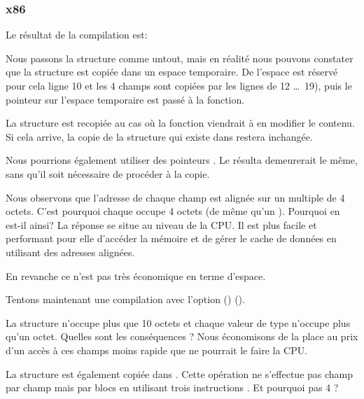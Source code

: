 ﻿\subsubsection{x86}

Le résultat de la compilation est:



Nous passons la structure comme untout, mais en réalité nous pouvons constater que la structure est copiée 
dans un espace temporaire. De l'espace est réservé pour cela ligne 10 et les 4 champs sont copiées par les 
lignes de 12 \ldots\ 19), puis le pointeur sur l'espace temporaire est passé à la fonction.

La structure est recopiée au cas où la fonction \ttf{} viendrait à en modifier le contenu. Si cela arrive, 
la copie de la structure qui existe dans \main restera inchangée.

Nous pourrions également utiliser des pointeurs \CCpp. Le résulta demeurerait le même, sans qu'il soit 
nécessaire de procéder à la copie.

Nous observons que l'adresse de chaque champ est alignée sur un multiple de 4  octets. C'est pourquoi chaque 
\Tchar occupe 4 octets (de même qu'un \Tint). Pourquoi en est-il ainsi? La réponse se situe au niveau de la 
CPU. Il est plus facile et performant pour elle d'accéder la mémoire et de gérer le cache de données en 
utilisant des adresses alignées.

En revanche ce n'est pas très économique en terme d'espace.

Tentons maintenant une compilation avec l'option () ().



La structure n'occupe plus que 10 octets et chaque valeur de type \Tchar n'occupe plus qu'un octet. Quelles 
sont les conséquences ? Nous économisons de la place au prix d'un accès à ces champs moins rapide que ne 
pourrait le faire la CPU.

\label{short_struct_copying_using_MOV}

La structure est également copiée dans \main. Cette opération ne s'effectue pas champ par champ mais par 
blocs en utilisant trois instructions \MOV. Et pourquoi pas 4 ?

